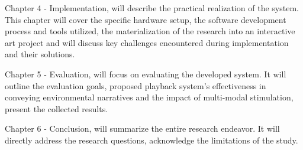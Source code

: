     Chapter 4 - Implementation, will describe the practical realization of the system. This chapter will cover the specific hardware setup, the software development process and tools utilized, the materialization of the research into an interactive art project and will discuss key challenges encountered during implementation and their solutions.\par

    Chapter 5 - Evaluation, will focus on evaluating the developed system. It will outline the evaluation goals, proposed playback system's effectiveness in conveying environmental narratives and the impact of multi-modal stimulation, present the collected results.\par

    Chapter 6 - Conclusion, will summarize the entire research endeavor. It will directly address the research questions, acknowledge the limitations of the study.\par